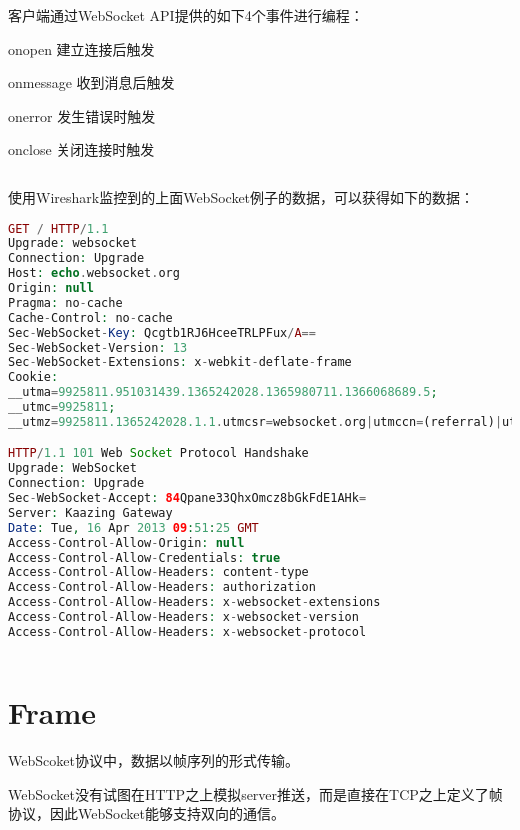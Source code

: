客户端通过WebSocket API提供的如下4个事件进行编程：

\begin{compactitem}
\item onopen 建立连接后触发
\item onmessage 收到消息后触发
\item onerror 发生错误时触发
\item onclose 关闭连接时触发
\end{compactitem}




\begin{lstlisting}[language=PHP]

\end{lstlisting}


使用Wireshark监控到的上面WebSocket例子的数据，可以获得如下的数据：

\begin{lstlisting}[language=PHP]
GET / HTTP/1.1
Upgrade: websocket
Connection: Upgrade
Host: echo.websocket.org
Origin: null
Pragma: no-cache
Cache-Control: no-cache
Sec-WebSocket-Key: Qcgtb1RJ6HceeTRLPFux/A==
Sec-WebSocket-Version: 13
Sec-WebSocket-Extensions: x-webkit-deflate-frame
Cookie: 
__utma=9925811.951031439.1365242028.1365980711.1366068689.5; 
__utmc=9925811; 
__utmz=9925811.1365242028.1.1.utmcsr=websocket.org|utmccn=(referral)|utmcmd=referral|utmcct=/

HTTP/1.1 101 Web Socket Protocol Handshake
Upgrade: WebSocket
Connection: Upgrade
Sec-WebSocket-Accept: 84Qpane33QhxOmcz8bGkFdE1AHk=
Server: Kaazing Gateway
Date: Tue, 16 Apr 2013 09:51:25 GMT
Access-Control-Allow-Origin: null
Access-Control-Allow-Credentials: true
Access-Control-Allow-Headers: content-type
Access-Control-Allow-Headers: authorization
Access-Control-Allow-Headers: x-websocket-extensions
Access-Control-Allow-Headers: x-websocket-version
Access-Control-Allow-Headers: x-websocket-protocol
\end{lstlisting}

\begin{lstlisting}[language=PHP]

\end{lstlisting}


\section{Frame}


WebScoket协议中，数据以帧序列的形式传输。

WebSocket没有试图在HTTP之上模拟server推送，而是直接在TCP之上定义了帧协议，因此WebSocket能够支持双向的通信。

